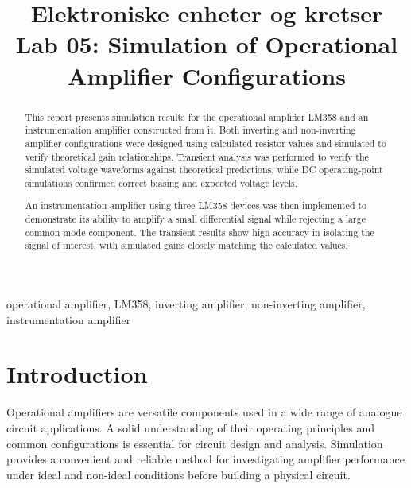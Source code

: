 \documentclass[conference]{IEEEtran}
\begin{document}
\title{Elektroniske enheter og kretser\\
Lab 05: Simulation of Operational Amplifier Configurations}

\author{
}

\maketitle


\begin{abstract}
This report presents simulation results for the operational amplifier LM358 and an instrumentation amplifier constructed from it.
Both inverting and non-inverting amplifier configurations were designed using calculated resistor values and simulated to verify theoretical gain relationships.  
Transient analysis was performed to verify the simulated voltage waveforms against theoretical predictions, while DC operating-point simulations confirmed correct biasing and expected voltage levels.

An instrumentation amplifier using three LM358 devices was then implemented to demonstrate its ability to amplify a small differential signal while rejecting a large common-mode component.  
The transient results show high accuracy in isolating the signal of interest, with simulated gains closely matching the calculated values.  
\end{abstract}

\begin{IEEEkeywords}
operational amplifier, LM358, inverting amplifier, non-inverting amplifier, instrumentation amplifier
\end{IEEEkeywords}

\section{Introduction}

Operational amplifiers are versatile components used in a wide range of analogue circuit applications.  
A solid understanding of their operating principles and common configurations is essential for circuit design and analysis.  
Simulation provides a convenient and reliable method for investigating amplifier performance under ideal and non-ideal conditions before building a physical circuit.
\end{document}
